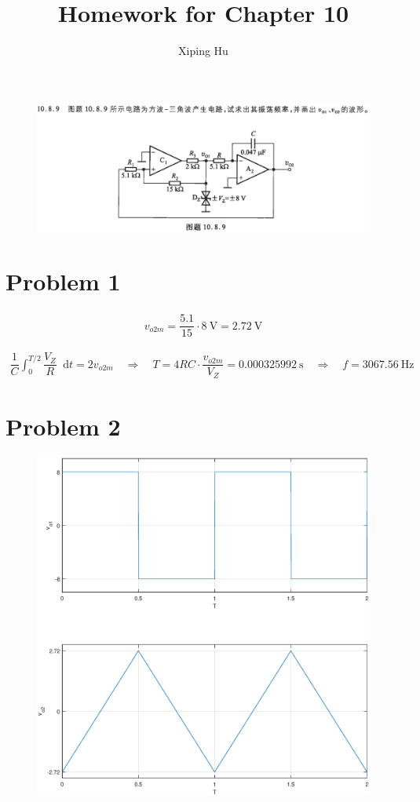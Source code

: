 \documentclass{article}
\author{Xiping Hu}
\affil{https://hxp.plus/}
\title{Homework for Chapter 10}
\newcommand*{\md}{\mathop{}\!\mathrm{d}}
\newcommand{\si}[1]{\  \mathrm{#1}}
\begin{document}
\maketitle

\begin{figure}[H]
  \centering
  \includegraphics[width=\linewidth]{figures/Problem1089.png}
\end{figure}

\section{Problem 1}

\begin{equation*}
  \begin{aligned}
    v_{o2m} = \dfrac{5.1}{15} \cdot 8 \si{V} = 2.72 \si{V} 
  \end{aligned}
\end{equation*}

\begin{equation*}
  \begin{aligned}
    \dfrac{1}{C} \int_0^{T/2} \dfrac{V_Z}{R} \md t = 2 v_{o2m} \quad \Rightarrow \quad T = 4 R C \cdot \dfrac{v_{o2m}}{V_Z} = 0.000325992 \si{s} \quad \Rightarrow \quad f = 3067.56 \si{Hz}
  \end{aligned}
\end{equation*}

\section{Problem 2}

\begin{figure}[H]
  \centering
  \includegraphics[width=\linewidth]{figures/Problem1089.eps}
\end{figure}
\end{document}
